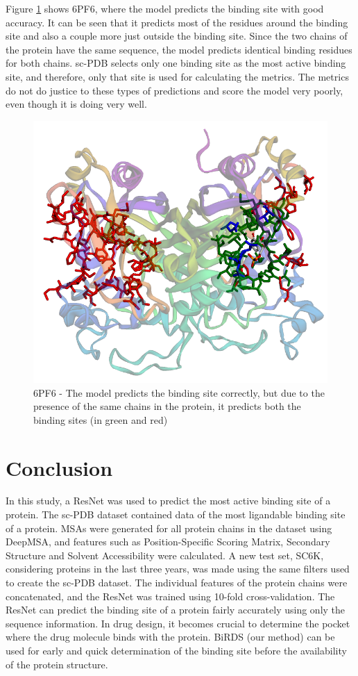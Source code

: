 \documentclass[journal=jacsat,manuscript=article]{achemso}
\begin{document}
Figure \ref{fig:6pf6} shows 6PF6\cite{czyzyk2019structure}, where the model predicts the binding site with good accuracy. It can be seen that it predicts most of the residues around the binding site and also a couple more just outside the binding site. Since the two chains of the protein have the same sequence, the model predicts identical binding residues for both chains. sc-PDB selects only one binding site as the most active binding site, and therefore, only that site is used for calculating the metrics. The metrics do not do justice to these types of predictions and score the model very poorly, even though it is doing very well.
\begin{figure}
    \centering
    \noindent\includegraphics[scale=0.4]{6pf6.png}
    \caption{\centering 6PF6 - The model predicts the binding site correctly, but due to the presence of the same chains in the protein, it predicts both the binding sites (in green and red)}
    \label{fig:6pf6}
\end{figure}

\section{Conclusion}
In this study, a ResNet was used to predict the most active binding site of a protein. The sc-PDB\cite{desaphy2015sc} dataset contained data of the most ligandable binding site of a protein. MSAs were generated for all protein chains in the dataset using DeepMSA, and features such as Position-Specific Scoring Matrix, Secondary Structure and Solvent Accessibility were calculated. A new test set, SC6K, considering proteins in the last three years, was made using the same filters used to create the sc-PDB dataset. The individual features of the protein chains were concatenated, and the ResNet was trained using 10-fold cross-validation. The ResNet can predict the binding site of a protein fairly accurately using only the sequence information. In drug design, it becomes crucial to determine the pocket where the drug molecule binds with the protein. BiRDS (our method) can be used for early and quick determination of the binding site before the availability of the protein structure.
\end{document}
